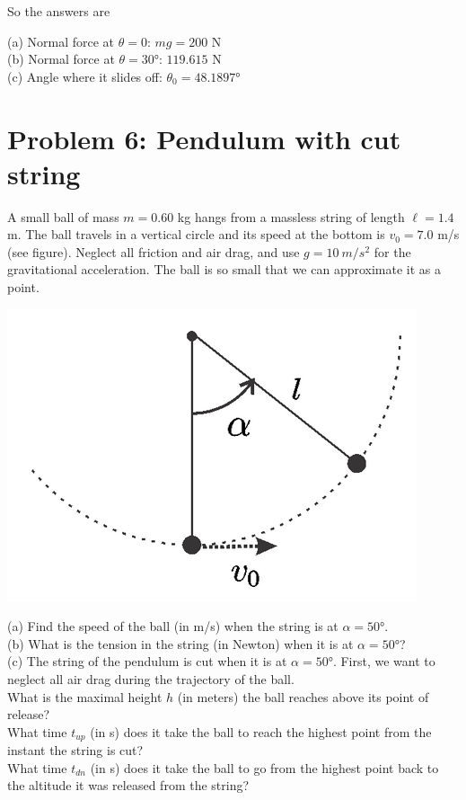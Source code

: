 \documentclass[8.01x]{subfiles}
\begin{document}
So the answers are

(a) Normal force at $\theta = 0$: $m g = 200$ N\\
(b) Normal force at $\theta = \ang{30}$: $119.615$ N\\
(c) Angle where it slides off: $\theta_0 = \ang{48.1897}$

\section{Problem 6: Pendulum with cut string}

A small ball of mass $m = 0.60$ kg hangs from a massless string of length $\ell = 1.4$ m. The ball travels in a vertical circle and its speed at the bottom is $v_0 = 7.0$ m/s (see figure). Neglect all friction and air drag, and use $g = \SI{10}{m/s^2}$ for the gravitational acceleration. The ball is so small that we can approximate it as a point.

\begin{center}
\includegraphics[scale=0.5]{Graphics/midterm2p6}
\end{center}

(a) Find the speed of the ball (in m/s) when the string is at $\alpha = \ang{50}$.\\
(b) What is the tension in the string (in Newton) when it is at $\alpha = \ang{50}$?\\
(c) The string of the pendulum is cut when it is at $\alpha = \ang{50}$. First, we want to neglect all air drag during the trajectory of the ball.\\
What is the maximal height $h$ (in meters) the ball reaches above its point of release?\\
What time $t_{up}$ (in s) does it take the ball to reach the highest point from the instant the string is cut?\\
What time $t_{dn}$ (in s) does it take the ball to go from the highest point back to the altitude it was released from the string?
\end{document}
